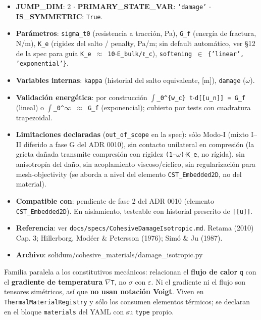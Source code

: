 \documentclass[11pt,letterpaper,oneside]{report}
\begin{document}
\begin{itemize}
  \item \textbf{JUMP\_DIM}: 2 \ensuremath{\cdot} \textbf{PRIMARY\_STATE\_VAR}: \texttt{'damage'} \ensuremath{\cdot} \textbf{IS\_SYMMETRIC}: \texttt{True}.
  \item \textbf{Parámetros}: \texttt{sigma\_t0} (resistencia a tracción, Pa), \texttt{G\_f} (energía de fractura, N/m), \texttt{K\_e} (rigidez del salto / penalty, Pa/m; sin default automático, ver §12 de la spec para guía \texttt{K\_e \ensuremath{\approx} 10\ensuremath{\cdot}E\_bulk/ℓ\_c}), \texttt{softening \ensuremath{\in} \{'linear', 'exponential'\}}.
  \item \textbf{Variables internas}: \texttt{kappa} (historial del salto equivalente, [m]), \texttt{damage} (\ensuremath{\omega}).
  \item \textbf{Validación energética}: por construcción \texttt{\ensuremath{\int}\_0\textasciicircum{}\{w\_c\} t\ensuremath{\cdot}d[[u\_n]] = G\_f} (lineal) o \texttt{\ensuremath{\int}\_0\textasciicircum{}\ensuremath{\infty} \ensuremath{\approx} G\_f} (exponencial); cubierto por tests con cuadratura trapezoidal.
  \item \textbf{Limitaciones declaradas} (\texttt{out\_of\_scope} en la spec): sólo Modo-I (mixto I--II diferido a fase G del ADR 0010), sin contacto unilateral en compresión (la grieta dañada transmite compresión con rigidez \texttt{(1−\ensuremath{\omega})\ensuremath{\cdot}K\_e}, no rígida), sin anisotropía del daño, sin acoplamiento viscoso/cíclico, sin regularización para mesh-objectivity (se aborda a nivel del elemento \texttt{CST\_Embedded2D}, no del material).
  \item \textbf{Compatible con}: pendiente de fase 2 del ADR 0010 (elemento \texttt{CST\_Embedded2D}). En aislamiento, testeable con historial prescrito de \texttt{[[u]]}.
  \item \textbf{Referencia}: ver \texttt{docs/specs/CohesiveDamageIsotropic.md}. Retama (2010) Cap. 3; Hillerborg, Modéer \& Petersson (1976); Simó \& Ju (1987).
  \item \textbf{Archivo}: solidum/cohesive\_materials/damage\_isotropic.py
\end{itemize}


Familia paralela a los constitutivos mecánicos: relacionan el \textbf{flujo de calor} \texttt{q} con el \textbf{gradiente de temperatura} \texttt{\ensuremath{\nabla}T}, no \texttt{\ensuremath{\sigma}} con \texttt{\ensuremath{\varepsilon}}. Ni el gradiente ni el flujo son tensores simétricos, así que \textbf{no usan notación Voigt}. Viven en \texttt{ThermalMaterialRegistry} y sólo los consumen elementos térmicos; se declaran en el bloque \texttt{materials} del YAML con su \texttt{type} propio.
\end{document}
